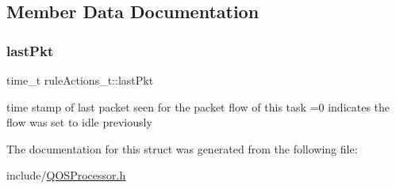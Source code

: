\subsection{Member Data Documentation}
\mbox{\label{structruleActions__t_ab5d6b8c4bc751e5db10186fdb6d7757f}} 
\subsubsection{\texorpdfstring{last\+Pkt}{lastPkt}}
{\footnotesize\ttfamily time\+\_\+t rule\+Actions\+\_\+t\+::last\+Pkt}

time stamp of last packet seen for the packet flow of this task =0 indicates the flow was set to idle previously 

The documentation for this struct was generated from the following file\+:\begin{DoxyCompactItemize}
\item 
include/\hyperlink{QOSProcessor_8h}{Q\+O\+S\+Processor.\+h}\end{DoxyCompactItemize}
